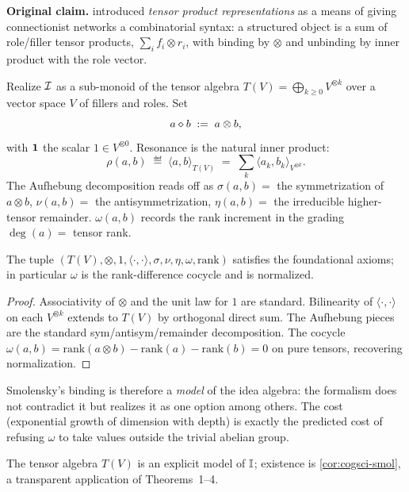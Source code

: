 \textbf{Original claim.} \citet{Smolensky1990} introduced \emph{tensor
product representations} as a means of giving connectionist networks a
combinatorial syntax: a structured object is a sum of role/filler tensor
products, $\sum_i f_i\otimes r_i$, with binding by $\otimes$ and unbinding
by inner product with the role vector.

\formalclaim Realize $\mathcal{I}$ as a sub-monoid of the tensor algebra
$T(V)=\bigoplus_{k\ge 0}V^{\otimes k}$ over a vector space $V$ of fillers
and roles. Set
\[
  a\mathbin{\diamond} b \;\mathrel{:=}\; a\otimes b,
\]
with $\mathbf{1}$ the scalar $1\in V^{\otimes 0}$. Resonance is the natural
inner product:
\[
  \rho(a,b)\;\eqdef\;\langle a,b\rangle_{T(V)}
  \;=\;\sum_k \langle a_k,b_k\rangle_{V^{\otimes k}}.
\]
The Aufhebung decomposition reads off as
$\sigma(a,b)=$ the symmetrization of $a\otimes b$, $\nu(a,b)=$ the
antisymmetrization, $\eta(a,b)=$ the irreducible higher-tensor remainder.
$\omega(a,b)$ records the rank increment in the grading
$\deg(a)=$ tensor rank.

\begin{corollary}\label{cor:cogsci-smol}
The tuple $(T(V),\otimes,1,\langle\cdot,\cdot\rangle,\sigma,\nu,\eta,
\omega,\mathrm{rank})$ satisfies the foundational axioms; in particular
$\omega$ is the rank-difference cocycle and is normalized.
\end{corollary}

\begin{proof}
Associativity of $\otimes$ and the unit law for $1$ are standard.
Bilinearity of $\langle\cdot,\cdot\rangle$ on each $V^{\otimes k}$
extends to $T(V)$ by orthogonal direct sum. The Aufhebung pieces are
the standard sym/antisym/remainder decomposition. The cocycle
$\omega(a,b)=\mathrm{rank}(a\otimes b)-\mathrm{rank}(a)-\mathrm{rank}(b)
=0$ on pure tensors, recovering normalization. \qedhere
\end{proof}

Smolensky's binding is therefore a \emph{model} of the idea algebra: the
formalism does not contradict it but realizes it as one option among
others. The cost (exponential growth of dimension with depth) is exactly
the predicted cost of refusing $\omega$ to take values outside the trivial
abelian group.

\formalstatus The tensor algebra $T(V)$ is an explicit model of
$\mathbb{I}$; existence is \cref{cor:cogsci-smol}, a transparent application
of Theorems~1--4.

